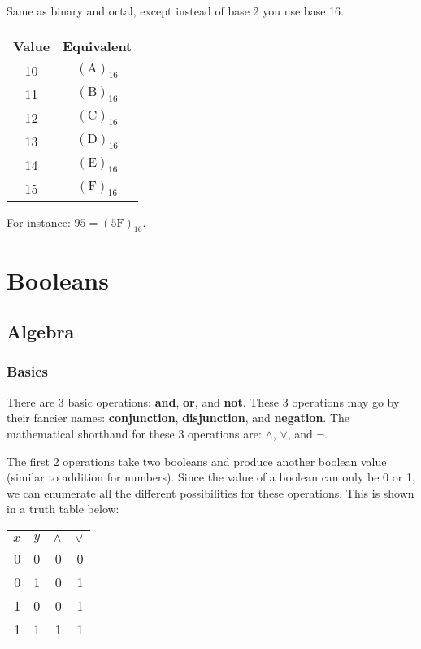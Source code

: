 \documentclass[12pt]{book}
\begin{document}
  Same as binary and octal, except instead of base 2 you use base 16.

  \begin{tabular}{c c}
    \hline
    Value & Equivalent \\
    \hline
    10 & $(\text{A})_{16}$ \\
    11 & $(\text{B})_{16}$ \\
    12 & $(\text{C})_{16}$ \\
    13 & $(\text{D})_{16}$ \\
    14 & $(\text{E})_{16}$ \\
    15 & $(\text{F})_{16}$ \\
  \end{tabular}

  For instance: $95 = (5\text{F})_{16}$.

  \chapter{Booleans}

  \section{Algebra}

  \subsection{Basics}

  There are 3 basic operations: \textbf{and}, \textbf{or}, and \textbf{not}.
  These 3 operations may go by their fancier names: \textbf{conjunction},
  \textbf{disjunction}, and \textbf{negation}. The mathematical shorthand for
  these 3 operations are: $\land$, $\lor$, and $\lnot$.

  The first 2 operations take two booleans and produce another boolean value
  (similar to addition for numbers). Since the value of a boolean can only be
  0 or 1, we can enumerate all the different possibilities for these operations.
  This is shown in a truth table below:

  \begin{center}
    \begin{tabular}{r r | r | r}
      $x$ & $y$ & $\land$ & $\lor$ \\
      \hline
        0 &   0 &       0 &      0 \\
        0 &   1 &       0 &      1 \\
        1 &   0 &       0 &      1 \\
        1 &   1 &       1 &      1 \\
    \end{tabular}
  \end{center}
\end{document}

